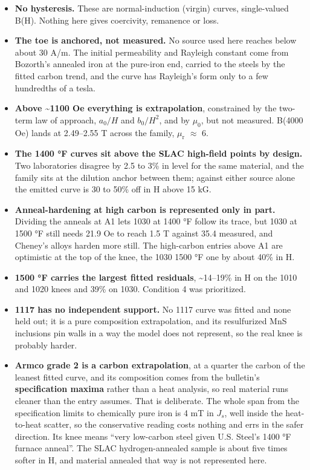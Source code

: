 \documentclass[
  11pt,
]{article}
\newcounter{none} %
\providecommand{\tightlist}{%
  \setlength{\itemsep}{0pt}\setlength{\parskip}{0pt}}
\begin{document}
\begin{itemize}
\tightlist
\item \textbf{No hysteresis.} These are normal-induction (virgin) curves, single-valued B(H). Nothing here gives coercivity, remanence or loss.
\item \textbf{The toe is anchored, not measured.} No source used here reaches below about 30 A/m. The initial permeability and Rayleigh constant come from Bozorth's annealed iron at the pure-iron end, carried to the steels by the fitted carbon trend, and the curve has Rayleigh's form only to a few hundredths of a tesla.
\item \textbf{Above \textasciitilde1100 Oe everything is extrapolation}, constrained by the two-term law of approach, \(a_0/H\) and \(b_0/H^{2}\), and by \(\mu_{0}\), but not measured. B(4000 Oe) lands at 2.49--2.55 T across the family, \(\mu_\mathrm{r}\) \(\approx\) 6.
\item \textbf{The 1400 °F curves sit above the SLAC high-field points by design.} Two laboratories disagree by 2.5 to 3\% in level for the same material, and the family sits at the dilution anchor between them; against either source alone the emitted curve is 30 to 50\% off in H above 15 kG.
\item \textbf{Anneal-hardening at high carbon is represented only in part.} Dividing the anneals at A1 lets 1030 at 1400 °F follow its trace, but 1030 at 1500 °F still needs 21.9 Oe to reach 1.5 T against 35.4 measured, and Cheney's alloys harden more still. The high-carbon entries above A1 are optimistic at the top of the knee, the 1030 1500 °F one by about 40\% in H.
\item \textbf{1500 °F carries the largest fitted residuals}, \textasciitilde14--19\% in H on the 1010 and 1020 knees and 39\% on 1030. Condition 4 was prioritized.
\item \textbf{1117 has no independent support.} No 1117 curve was fitted and none held out; it is a pure composition extrapolation, and its resulfurized MnS inclusions pin walls in a way the model does not represent, so the real knee is probably harder.
\item \textbf{Armco grade 2 is a carbon extrapolation}, at a quarter the carbon of the leanest fitted curve, and its composition comes from the bulletin's \textbf{specification maxima} rather than a heat analysis, so real material runs cleaner than the entry assumes. That is deliberate. The whole span from the specification limits to chemically pure iron is 4 mT in \(J_s\), well inside the heat-to-heat scatter, so the conservative reading costs nothing and errs in the safer direction. Its knee means ``very low-carbon steel given U.S. Steel's 1400 °F furnace anneal''. The SLAC hydrogen-annealed sample is about five times softer in H, and material annealed that way is not represented here.

\end{itemize}
\end{document}

